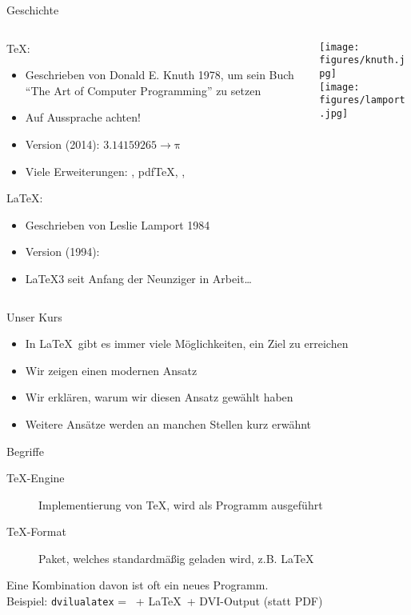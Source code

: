 \begin{frame}{Geschichte}
  \begin{columns}
    \begin{column}{0.73\textwidth}
      \TeX:
      \begin{itemize}
        \item Geschrieben von Donald E. Knuth 1978, um sein Buch \enquote{The Art of Computer Programming} zu setzen
        \item Auf Aussprache achten!
        \item Version (2014): $3.14159265 → \mathup{π}$
        \item Viele Erweiterungen: \eTeX, pdf\TeX, \XeTeX, \LuaTeX
      \end{itemize}

      \vspace{10pt}
      \LaTeX:
      \begin{itemize}
        \item Geschrieben von Leslie Lamport 1984
        \item Version (1994): \LaTeXe
        \item \LaTeX3 seit Anfang der Neunziger in Arbeit…
      \end{itemize}
    \end{column}
    \begin{column}{0.23\textwidth}
      \texttt{[image: figures/knuth.jpg]}\\
      \texttt{[image: figures/lamport.jpg]}
    \end{column}
  \end{columns}
\end{frame}

\begin{frame}{Unser Kurs}
  \Large
  \begin{itemize}
    \item In \LaTeX\ gibt es immer viele Möglichkeiten, ein Ziel zu erreichen
    \item Wir zeigen einen modernen Ansatz
    \item Wir erklären, warum wir diesen Ansatz gewählt haben
    \item Weitere Ansätze werden an manchen Stellen kurz erwähnt
  \end{itemize}
\end{frame}

\begin{frame}{Begriffe}
  \Large
  \begin{description}
    \item[\TeX-Engine] Implementierung von \TeX, wird als Programm ausgeführt
    \item[\TeX-Format] Paket, welches standardmäßig geladen wird, z.B. \LaTeX
  \end{description}

  \vspace{10pt}
  Eine Kombination davon ist oft ein neues Programm.\\[10pt]
  Beispiel: \texttt{dvilualatex} = \LuaTeX\ + \LaTeX\ + DVI-Output (statt PDF)
\end{frame}
